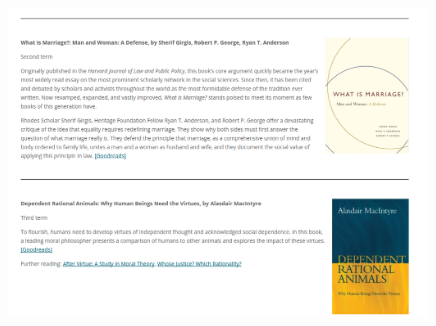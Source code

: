 \documentclass[xcolor=dvipsnames]{beamer}
\begin{document}
\begin{frame}[plain]
  \begin{columns}[T] %
    \begin{column}{0.9\textwidth}
      \begin{figure}[H]
        \centering
        \includegraphics[width=0.99\textwidth]{marriage}
      \end{figure}
    \end{column}%
  \end{columns}
\end{frame}
\end{document}
